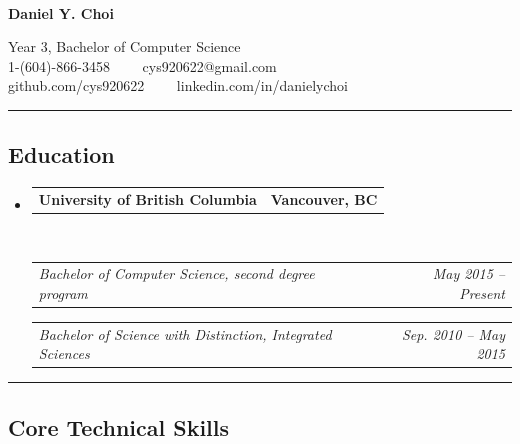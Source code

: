 \documentclass[10pt,letterpaper]{article}
\makeatletter
\newcommand{\headerrow}[2]
{\begin{tabular*}{\linewidth}{l@{\extracolsep{\fill}}r}
	#1 &
	#2 \\
\end{tabular*}}
\makeatother
\begin{document}

\begin{center}
\thispagestyle{firststyle}
{\LARGE \textbf{\\Daniel Y. Choi}}

Year 3, Bachelor of Computer Science
\\
1-(604)-866-3458\ \ \textbullet
\ \ cys920622@gmail.com
\\
github.com/cys920622\ \ \textbullet
\ \ linkedin.com/in/danielychoi
\end{center}

\hrule
\vspace{-0.4em}

\subsection*{Education}

\begin{itemize}
	\parskip=0.1em

	\item 
	\headerrow
		{\textbf{University of British Columbia}}
		{\textbf{Vancouver, BC}}
	\\
	\headerrow
		{\emph{Bachelor of Computer Science, second degree program}}
		{\emph{May 2015 -- Present}}
	
	\headerrow
		{\emph{Bachelor of Science with Distinction, Integrated Sciences}}
		{\emph{Sep. 2010 -- May 2015}}
\end{itemize}


\hrule
\vspace{-0.4em}

\subsection*{Core Technical Skills}
\end{document}

